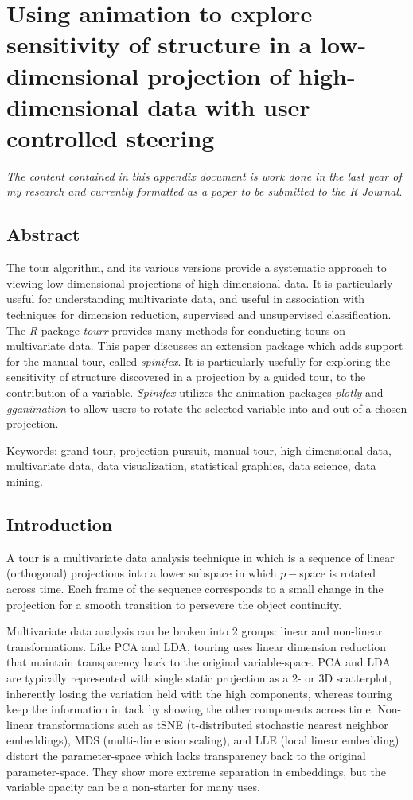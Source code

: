 \documentclass{monashthesis}
\begin{document}
\chapter{Using animation to explore sensitivity of structure in a
low-dimensional projection of high-dimensional data with user controlled
steering}\label{ch:spinifex_paper}

\emph{The content contained in this appendix document is work done in
the last year of my research and currently formatted as a paper to be
submitted to the R Journal.}

\section{Abstract}\label{abstract-1}

The tour algorithm, and its various versions provide a systematic
approach to viewing low-dimensional projections of high-dimensional
data. It is particularly useful for understanding multivariate data, and
useful in association with techniques for dimension reduction,
supervised and unsupervised classification. The \emph{R} package
\emph{tourr} provides many methods for conducting tours on multivariate
data. This paper discusses an extension package which adds support for
the manual tour, called \emph{spinifex}. It is particularly usefully for
exploring the sensitivity of structure discovered in a projection by a
guided tour, to the contribution of a variable. \emph{Spinifex} utilizes
the animation packages \emph{plotly} and \emph{gganimation} to allow
users to rotate the selected variable into and out of a chosen
projection.

Keywords: grand tour, projection pursuit, manual tour, high dimensional
data, multivariate data, data visualization, statistical graphics, data
science, data mining.

\section{Introduction}\label{introduction}

A tour is a multivariate data analysis technique in which is a sequence
of linear (orthogonal) projections into a lower subspace in which
\(p-\)space is rotated across time. Each frame of the sequence
corresponds to a small change in the projection for a smooth transition
to persevere the object continuity.

Multivariate data analysis can be broken into 2 groups: linear and
non-linear transformations. Like PCA and LDA, touring uses linear
dimension reduction that maintain transparency back to the original
variable-space. PCA and LDA are typically represented with single static
projection as a 2- or 3D scatterplot, inherently losing the variation
held with the high components, whereas touring keep the information in
tack by showing the other components across time. Non-linear
transformations such as tSNE (t-distributed stochastic nearest neighbor
embeddings), MDS (multi-dimension scaling), and LLE (local linear
embedding) distort the parameter-space which lacks transparency back to
the original parameter-space. They show more extreme separation in
embeddings, but the variable opacity can be a non-starter for many uses.
\end{document}
